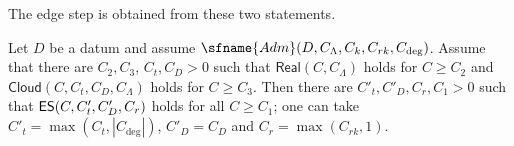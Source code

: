 The edge step is obtained from these two statements.

\begin{proposition}\label{pf:linkG:edgestep}
Let $D$ be a datum and assume $\sfname{Adm}(D,C_\Lambda,C_k,C_{rk},C_{\deg})$. Assume that there are $C_2,C_3$, $C_t,C_D>0$
such that $\mathsf{Real}(C,C_\Lambda)$ holds for $C\ge C_2$ and $\mathsf{Cloud}(C,C_t,C_D,C_\Lambda)$
holds for $C\ge C_3$. Then there are $C'_t,C'_D,C_r,C_1>0$ such that $\mathsf{ES}(C,C'_t,C'_D,C_r)$ holds for all
$C\ge C_1$; one can take $C'_t=\max(C_t,|C_{\deg}|)$, $C'_D=C_D$ and $C_r=\max(C_{rk},1)$.
\end{proposition}

